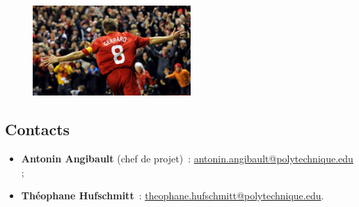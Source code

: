 \documentclass[a4paper,12pt]{article}
\begin{document}
\begin{figure}
  \centering 
  \includegraphics[width=6cm]{./gerrard.jpg}
\end{figure}

\subsection*{Contacts}

\begin{itemize}
 \item \textbf{Antonin Angibault} (chef de projet)~: \href{mailto:antonin.angibault@polytechnique.edu}{antonin.angibault@polytechnique.edu} ;
 \item \textbf{Théophane Hufschmitt}~: \href{mailto:theophane.hufschmitt@polytechnique.edu}{theophane.hufschmitt@polytechnique.edu}.
\end{itemize}

 
\end{document}
